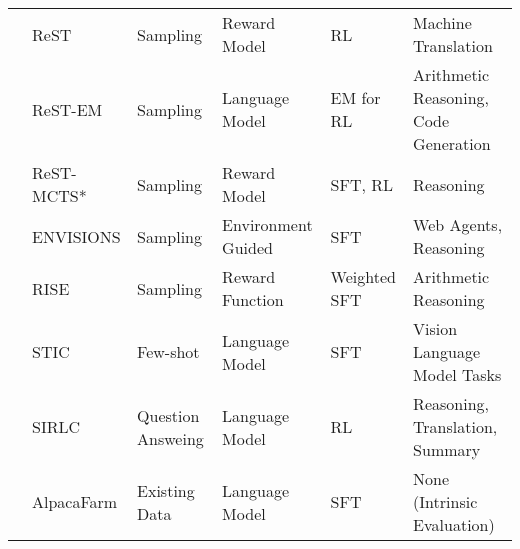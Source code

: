 \begin{table*}[t!]
{\begin{tabular}{llllll}
&  ReST \cite{DBLP:journals/corr/abs-2308-08998}              & Sampling &Reward Model &RL                                          &Machine Translation      \\

& \cellcolor[rgb]{ .949,  .949,  .949}ReST-EM \cite{singh2024humandatascalingselftraining}       & \cellcolor[rgb]{ .949,  .949,  .949}Sampling & \cellcolor[rgb]{ .949,  .949,  .949}Language Model & \cellcolor[rgb]{ .949,  .949,  .949}EM for RL                                   & \cellcolor[rgb]{ .949,  .949,  .949}Arithmetic Reasoning, Code Generation            \\

&  ReST-MCTS* \cite{zhang2024rest}  & Sampling  &Reward Model   &SFT, RL                    &  Reasoning                                              \\

& \cellcolor[rgb]{ .949,  .949,  .949}ENVISIONS \cite{DBLP:journals/corr/abs-2406-11736}         & \cellcolor[rgb]{ .949,  .949,  .949}Sampling & \cellcolor[rgb]{ .949,  .949,  .949}Environment Guided & \cellcolor[rgb]{ .949,  .949,  .949}SFT                      & \cellcolor[rgb]{ .949,  .949,  .949}Web Agents, Reasoning    \\

&  RISE \cite{qu2024recursiveintrospectionteachinglanguage}   &  Sampling &Reward Function &Weighted SFT                                &  Arithmetic Reasoning   \\

& \cellcolor[rgb]{ .949,  .949,  .949}STIC \cite{deng2024enhancinglargevisionlanguage}           & \cellcolor[rgb]{ .949,  .949,  .949}Few-shot & \cellcolor[rgb]{ .949,  .949,  .949}Language Model & \cellcolor[rgb]{ .949,  .949,  .949}SFT                       & \cellcolor[rgb]{ .949,  .949,  .949}Vision Language Model Tasks            \\ 

&  SIRLC \cite{DBLP:conf/iclr/PangWLC0Z024}   &Question Answeing  &Language Model &RL    &Reasoning, Translation, Summary   \\

& \cellcolor[rgb]{ .949,  .949,  .949}AlpacaFarm \cite{DBLP:conf/nips/DuboisLTZGBGLH23}           & \cellcolor[rgb]{ .949,  .949,  .949}Existing Data & \cellcolor[rgb]{ .949,  .949,  .949}Language Model & \cellcolor[rgb]{ .949,  .949,  .949}SFT                       & \cellcolor[rgb]{ .949,  .949,  .949}None (Intrinsic Evaluation)            \\ 


\end{tabular}}
\end{table*}
